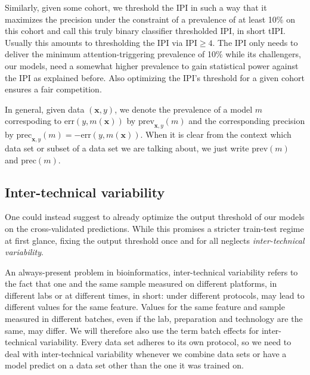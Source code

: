 Similarly, given some cohort, we threshold the IPI in such a way that it maximizes the precision under 
the constraint of a prevalence of at least \num{10}\% on this cohort and call this truly 
binary classifier thresholded IPI, in short tIPI. Usually this amounts to thresholding the IPI via 
$\text{IPI} \geq 4$. The IPI only needs to deliver the minimum 
attention-triggering prevalence of \num{10}\% while its challengers, our models, need a somewhat 
higher prevalence to gain statistical power against the IPI as explained before. Also optimizing 
the IPI's threshold for a given cohort ensures a fair competition.

In general, given data $(\mathbf{x}, y)$, we denote the prevalence of a model $m$ correspoding to 
$\text{err}(y, m(\textbf{x}))$ by $\text{prev}_{\mathbf{x}, y}(m)$ and the corresponding precision 
by $\text{prec}_{\mathbf{x}, y}(m) = -\text{err}(y, m(\textbf{x}))$. When it is clear from the 
context which data set or subset of a data set we are talking about, we just write $\text{prev}(m)$ 
and $\text{prec}(m)$.

\subsection{Inter-technical variability} 
One could instead suggest to already optimize the output threshold of our models on the cross-validated 
predictions. While this promises a stricter train-test regime at first glance, fixing the output 
threshold once and for all neglects \textit{inter-technical variability}. 

An always-present problem in bioinformatics, inter-technical variability refers to the fact that 
one and the same sample measured on different platforms, in different labs or at different times, 
in short: under different protocols, may lead to different values for the same feature. 
Values for the same feature and sample measured in different batches, even if the lab, preparation 
and technology are the same, may differ. We will therefore also use the term batch effects for 
inter-technical variability. Every data set adheres to its own protocol, so we need to deal with 
inter-technical variability whenever we combine data sets or have a model predict on a data set 
other than the one it was trained on.

